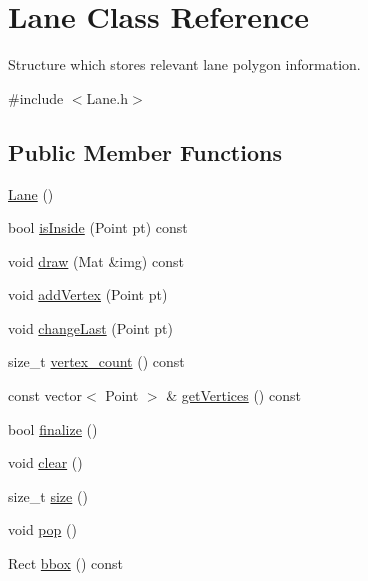 \hypertarget{class_lane}{
\section{\-Lane \-Class \-Reference}
\label{class_lane}
}


\-Structure which stores relevant lane polygon information.  




{\ttfamily \#include $<$\-Lane.\-h$>$}

\subsection*{\-Public \-Member \-Functions}
\begin{DoxyCompactItemize}
\item 
\hyperlink{class_lane_affd642d537d96c03cb7fe8c8d46d37b4}{\-Lane} ()
\item 
bool \hyperlink{class_lane_a00ad862ca66e457db8ccca02e9958b02}{is\-Inside} (\-Point pt) const 
\item 
void \hyperlink{class_lane_aa5d759585701af3deca218df97d39a57}{draw} (\-Mat \&img) const 
\item 
void \hyperlink{class_lane_a2ebccc1c188f1f4509f12f8c26732ed5}{add\-Vertex} (\-Point pt)
\item 
void \hyperlink{class_lane_aeb6b7a603dd2967f082741da570d5cd4}{change\-Last} (\-Point pt)
\item 
size\-\_\-t \hyperlink{class_lane_a2571564ae2da44202f37d0d4ea3ddabc}{vertex\-\_\-count} () const 
\item 
const vector$<$ \-Point $>$ \& \hyperlink{class_lane_a5338ac896ca262bb7ed2ea1b35b764ad}{get\-Vertices} () const 
\item 
bool \hyperlink{class_lane_a7efd7d37e4b94e2af27ce8b8b5d344e7}{finalize} ()
\item 
void \hyperlink{class_lane_a74015a1138e0cab2fcc8ff4e4dcecc81}{clear} ()
\item 
size\-\_\-t \hyperlink{class_lane_a7188a0e8dc49adb19f5a576c98e09742}{size} ()
\item 
void \hyperlink{class_lane_a560bf1ab27a296d68d9cd9c0ba7121a4}{pop} ()
\item 
\-Rect \hyperlink{class_lane_a766e891d06646b5d4179c1ba8ffe05a1}{bbox} () const 
\end{DoxyCompactItemize}
